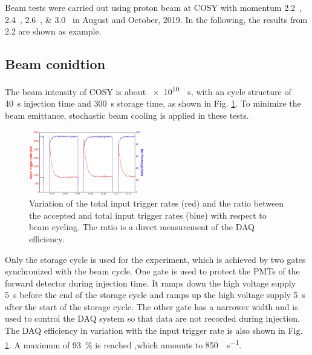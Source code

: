 \documentclass[number,5p]{elsarticle}
\begin{document}
Beam tests were carried out using proton beam at COSY with momentum
\SIlist[list-units=single]{2.2;2.4;2.6;3.0}{\momentum} in August and October, 2019.
In the following, the results from \SI{2.2}{\momentum} are shown as example.

\subsection{Beam conidtion}
\label{sec:beam}
The beam intensity of COSY is about \SI[per-mode=reciprocal]{e10}{\per\second}, with an cycle structure of
\SI{40}{\second} injection time and \SI{300}{\second} storage time, as shown in Fig. \ref{fig:beam}.
To minimize the beam emittance, stochastic beam cooling is applied in these tests.
\begin{figure}[h]
  \centering
  \includegraphics[width=0.45\textwidth]{./daq_efficiency.png}
  \caption{Variation of the total input trigger rates (red) and the ratio between the accepted
    and total input trigger rates (blue) with respect to beam cycling. The ratio
    is a direct measurement of the DAQ efficiency.}
  \label{fig:beam}
\end{figure}

Only the storage cycle is used for the experiment, which is achieved by two
gates synchronized with the beam cycle.
One gate is used to protect the PMTs of the forward detector during injection
time.
It ramps down the high voltage supply \SI{5}{\second} before the end of the
storage cycle and ramps up the high voltage supply \SI{5}{\second} after the start of the storage cycle.
The other gate has a narrower width and is used to control the DAQ system so that data are not recorded during injection.
The DAQ efficiency in variation with the input trigger rate is also shown in Fig. \ref{fig:beam}.
A maximum of \SI{93}{\percent} is reached ,which amounts to \SI{850}{\event\per\second}.
\end{document}
